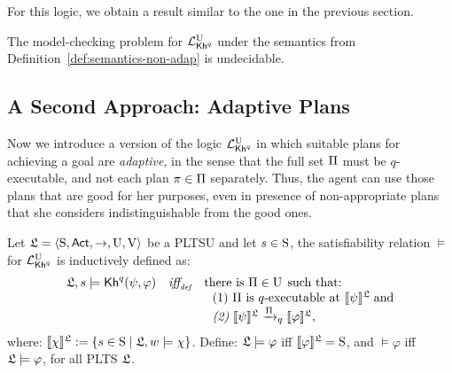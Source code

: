 For this logic, we obtain a result similar to the one in the previous section.

\begin{theorem}\label{th:mc-khp-nadapt-undecidable}
    The model-checking problem for $\PKhunc$ under the semantics from Definition~\ref{def:semantics-non-adap} is undecidable.
\end{theorem}


\subsection{A Second Approach: Adaptive Plans}

Now we introduce a version of the logic $\PKhunc$ in which suitable plans for achieving a goal are \emph{adaptive}, in the sense that the full set $\plans$ must be $q$-executable, and not each plan $\plan\in\plans$ separately. Thus, the agent can use those plans that are good for her purposes, even in presence of non-appropriate plans that she considers indistinguishable from the good ones. 

\begin{definition} \label{def:semantics-adap}
    Let $\model = \tup{\S,\Act,\ra,\Unc,\V}$ be a PLTSU and let $s\in\S$, the satisfiability relation $\models$ for $\PKhunc$ is inductively defined as:
    \[
    \begin{array}{l@{\ \ \ }c@{\ \ \  }l}
    \model, s \models \kh^q(\psi,\varphi) & \iffdef & \text{there is } \plans \in \Unc \;\text{such that:} \\
    & & \ \ \text{\rm (1)} \ \plans \text{ is $q$-executable at }  \truthset{\model}{\psi}\; \text{and} \\
    & & \ \ \text{\em (2)} \ \truthset{\model}{\psi} \reach{\plans}_q \truthset{\model}{\varphi}, 
    \end{array}
    \]     
    \noindent where: $\truthset{\model}{\chi} := \csetsc{s\in\S}{\model,w\models\chi}$. Define: $\model\models\varphi$ iff  $\truthset{\model}{\varphi}=\S$, and $\models\varphi$ iff $\model\models\varphi$, for all PLTS $\model$.
\end{definition}

